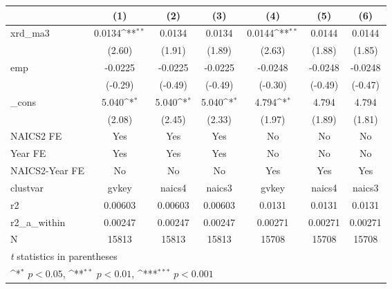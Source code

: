 {
\def\sym#1{\ifmmode^{#1}\else\(^{#1}\)\fi}
\begin{tabular}{l*{6}{c}}
\hline\hline
            &\multicolumn{1}{c}{(1)}         &\multicolumn{1}{c}{(2)}         &\multicolumn{1}{c}{(3)}         &\multicolumn{1}{c}{(4)}         &\multicolumn{1}{c}{(5)}         &\multicolumn{1}{c}{(6)}         \\
\hline
xrd\_ma3     &      0.0134\sym{**} &      0.0134         &      0.0134         &      0.0144\sym{**} &      0.0144         &      0.0144         \\
            &      (2.60)         &      (1.91)         &      (1.89)         &      (2.63)         &      (1.88)         &      (1.85)         \\
[1em]
emp         &     -0.0225         &     -0.0225         &     -0.0225         &     -0.0248         &     -0.0248         &     -0.0248         \\
            &     (-0.29)         &     (-0.49)         &     (-0.49)         &     (-0.30)         &     (-0.49)         &     (-0.47)         \\
[1em]
\_cons      &       5.040\sym{*}  &       5.040\sym{*}  &       5.040\sym{*}  &       4.794\sym{*}  &       4.794         &       4.794         \\
            &      (2.08)         &      (2.45)         &      (2.33)         &      (1.97)         &      (1.89)         &      (1.81)         \\
[1em]
NAICS2 FE   &         Yes         &         Yes         &         Yes         &          No         &          No         &          No         \\
[1em]
Year FE     &         Yes         &         Yes         &         Yes         &          No         &          No         &          No         \\
[1em]
NAICS2-Year FE&          No         &          No         &          No         &         Yes         &         Yes         &         Yes         \\
\hline
clustvar    &       gvkey         &      naics4         &      naics3         &       gvkey         &      naics4         &      naics3         \\
r2          &     0.00603         &     0.00603         &     0.00603         &      0.0131         &      0.0131         &      0.0131         \\
r2\_a\_within &     0.00247         &     0.00247         &     0.00247         &     0.00271         &     0.00271         &     0.00271         \\
N           &       15813         &       15813         &       15813         &       15708         &       15708         &       15708         \\
\hline\hline
\multicolumn{7}{l}{\footnotesize \textit{t} statistics in parentheses}\\
\multicolumn{7}{l}{\footnotesize \sym{*} \(p<0.05\), \sym{**} \(p<0.01\), \sym{***} \(p<0.001\)}\\
\end{tabular}
}

